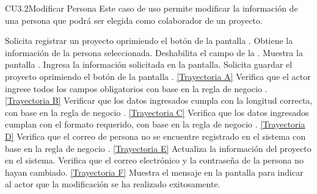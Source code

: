\begin{UseCase}{CU3.2}{Modificar Persona}{
		Este caso de uso permite modificar la información de una persona que podrá ser elegida como colaborador de un proyecto.
	}
{		}
	\end{UseCase}
	\begin{UCtrayectoria}
		\UCpaso[\UCactor] Solicita registrar un proyecto oprimiendo el botón \editar de la pantalla .
		\UCpaso[\UCsist] Obtiene la información de la persona seleccionada.
		\UCpaso[\UCsist] Deshabilita el campo de la .
		\UCpaso[\UCsist] Muestra la pantalla .
		\UCpaso[\UCactor] Ingresa la información solicitada en la pantalla. \label{CU3.2-P5}
		\UCpaso[\UCactor] Solicita guardar el proyecto oprimiendo el botón  de la pantalla . \hyperlink{CU3-2:TAA}{[Trayectoria A]}
		\UCpaso[\UCsist] Verifica que el actor ingrese todos los campos obligatorios con base en la regla de negocio . \hyperlink{CU3-2:TAB}{[Trayectoria B]}
		\UCpaso[\UCsist] Verificar que los datos ingresados cumpla con la longitud correcta, con base en la regla de negocio . \hyperlink{CU3-2:TAC}{[Trayectoria C]} 
		\UCpaso[\UCsist] Verifica que los datos ingresados cumplan con el formato requerido, con base en la regla de negocio . \hyperlink{CU3-2:TAD}{[Trayectoria D]} 
		\UCpaso[\UCsist] Verifica que el correo de persona no se encuentre registrado en el sistema con base en la regla de negocio . \hyperlink{CU3-2:TAE}{[Trayectoria E]}
		\UCpaso[\UCsist] Actualiza la información del proyecto en el sistema.
		\UCpaso[\UCsist] Verifica que el correo electrónico y la contraseña de la persona no hayan cambiado. \hyperlink{CU3-2:TAF}{[Trayectoria F]}
		\UCpaso[\UCsist] Muestra el mensaje  en la pantalla  para indicar al actor que la modificación se ha realizado exitosamente. 
	\end{UCtrayectoria}		
